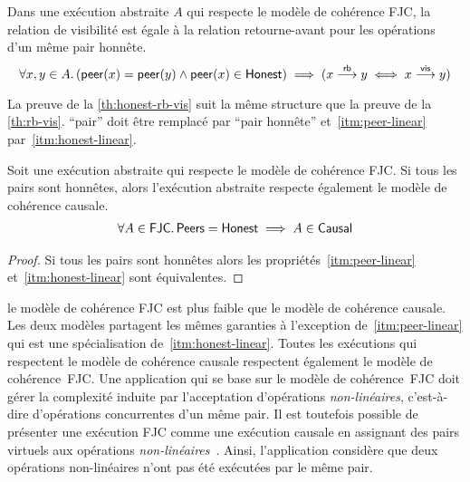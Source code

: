 \begin{proposition}\label{th:honest-rb-vis}
Dans une exécution abstraite $A$ qui respecte le modèle de cohérence \ac{FJC}, la relation de visibilité est égale à la relation retourne-avant pour les opérations d'un même pair honnête.
\begin{equation*}
    \forall x, y \in A \ldotp (\operatorname{\mathsf{peer}}(x) = \operatorname{\mathsf{peer}}(y) \land \operatorname{\mathsf{peer}}(x) \in \operatorname{\mathsf{Honest}}) \implies (x \overset{\mathsf{rb}}{\longrightarrow} y \iff x \overset{\mathsf{vis}}{\longrightarrow} y)
\end{equation*}
\end{proposition}

La preuve de la \autoref{th:honest-rb-vis} suit la même structure que la preuve de la \autoref{th:rb-vis}.
\enquote{pair} doit être remplacé par \enquote{pair honnête} et~\ref{itm:peer-linear} par~\ref{itm:honest-linear}.

\begin{proposition}\label{th:causal-fjc}
Soit une exécution abstraite qui respecte le modèle de cohérence \ac{FJC}.
Si tous les pairs sont honnêtes, alors l'exécution abstraite respecte également le modèle de cohérence causale.
\begin{equation*}\begin{split}
    \forall A \in \operatorname{\mathsf{FJC}} \ldotp \operatorname{\mathsf{Peers}} = \operatorname{\mathsf{Honest}} \implies A \in \operatorname{\mathsf{Causal}}
\end{split}\end{equation*}
\end{proposition}

\begin{proof}
Si tous les pairs sont honnêtes alors les propriétés~\ref{itm:peer-linear} et~\ref{itm:honest-linear} sont équivalentes.
\end{proof}

le modèle de cohérence \ac{FJC} est plus faible que le modèle de cohérence causale.
Les deux modèles partagent les mêmes garanties à l'exception de~\ref{itm:peer-linear} qui est une spécialisation de~\ref{itm:honest-linear}.
Toutes les exécutions qui respectent le modèle de cohérence causale respectent également le modèle de cohérence~\ac{FJC}.
Une application qui se base sur le modèle de cohérence~\ac{FJC} doit gérer la complexité induite par l'acceptation d'opérations \emph{non-linéaires}, c'est-à-dire d'opérations concurrentes d'un même pair.
Il est toutefois possible de présenter une exécution \ac{FJC} comme une exécution causale en assignant des pairs virtuels aux opérations \emph{non-linéaires}~\autocite{mahajan_depot_2011}.
Ainsi, l'application considère que deux opérations non-linéaires n'ont pas été exécutées par le même pair.


